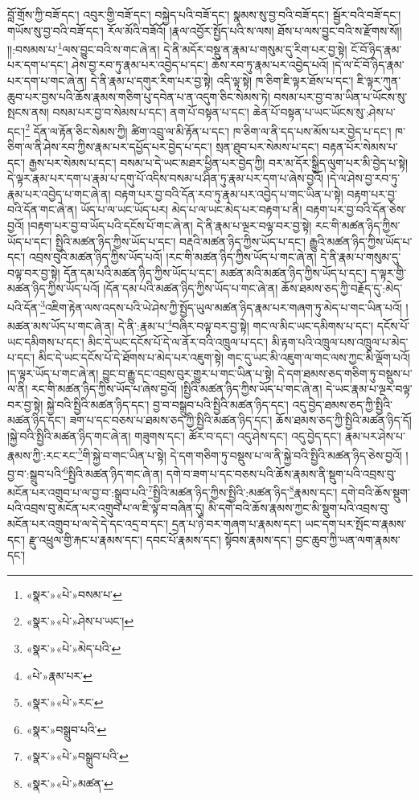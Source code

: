 བློ་གྲོས་ཀྱི་བཟོ་དང་། འབུར་གྱི་བཟོ་དང་། བསྐྱེད་པའི་བཟོ་དང་། སྣམས་སུ་བྱ་བའི་བཟོ་དང་། སྦྱོར་བའི་བཟོ་དང་། གཡོས་སུ་བྱ་བའི་བཟོ་དང་། རོལ་མོའི་བཟོའོ། །རྣལ་འབྱོར་སྤྱོད་པའི་ས་ལས། ཐོས་པ་ལས་བྱུང་བའི་ས་རྫོགས་སོ།། །།:བསམས་པ་\footnote{«སྣར་»«པེ་»བསམ་པ་}ལས་བྱུང་བའི་ས་གང་ཞེ་ན། དེ་ནི་མདོར་བསྡུ་ན་རྣམ་པ་གསུམ་དུ་རིག་པར་བྱ་སྟེ། ངོ་བོ་ཉིད་རྣམ་པར་དག་པ་དང་། ཤེས་བྱ་རབ་ཏུ་རྣམ་པར་འབྱེད་པ་དང་། ཆོས་རབ་ཏུ་རྣམ་པར་འབྱེད་པའོ། །དེ་ལ་ངོ་བོ་ཉིད་རྣམ་པར་དག་པ་གང་ཞེ་ན། དེ་ནི་རྣམ་པ་དགུར་རིག་པར་བྱ་སྟེ། འདི་ལྟ་སྟེ། ཁ་ཅིག་ཇི་ལྟར་ཐོས་པ་དང་། ཇི་ལྟར་ཀུན་ཆུབ་པར་བྱས་པའི་ཆོས་རྣམས་གཅིག་པུ་དབེན་པ་ན་འདུག་ཅིང་སེམས་ཏེ། བསམ་པར་བྱ་བ་མ་ཡིན་པ་ཡོངས་སུ་སྤངས་ནས། བསམ་པར་བྱ་བ་སེམས་པ་དང་། ནག་པོ་བསྟན་པ་དང་། ཆེན་པོ་བསྟན་པ་ཡང་ཡོངས་སུ་:ཤེས་པ་དང་།\footnote{«སྣར་»«པེ་»ཤེས་པ་ཡང་།} དོན་ལ་རྟོན་ཅིང་སེམས་ཀྱི། ཚིག་འབྲུ་ལ་མི་རྟོན་པ་དང་། ཁ་ཅིག་ལ་ནི་དད་པས་མོས་པར་བྱེད་པ་དང་། ཁ་ཅིག་ལ་ནི་ཤེས་རབ་ཀྱིས་རྣམ་པར་དཔྱོད་པར་བྱེད་པ་དང་། སྲན་ཐུབ་པར་སེམས་པ་དང་། བརྟན་པོར་སེམས་པ་དང་། རྒྱས་པར་སེམས་པ་དང་། བསམ་པ་དེ་ཡང་མཐར་ཕྱིན་པར་བྱེད་ཀྱི། བར་མ་དོར་སྒྱིད་ལུག་པར་མི་བྱེད་པ་སྟེ། དེ་ལྟར་རྣམ་པར་དག་པ་རྣམ་པ་དགུ་པོ་འདིས་བསམ་པ་ཤིན་ཏུ་རྣམ་པར་དག་པ་ཞེས་བྱའོ། །དེ་ལ་ཤེས་བྱ་རབ་ཏུ་རྣམ་པར་འབྱེད་པ་གང་ཞེ་ན། བརྟག་པར་བྱ་བའི་དོན་རབ་ཏུ་རྣམ་པར་འབྱེད་པ་གང་ཡིན་པ་སྟེ། བརྟག་པར་བྱ་བའི་དོན་གང་ཞེ་ན། ཡོད་པ་ལ་ཡང་ཡོད་པར། མེད་པ་ལ་ཡང་མེད་པར་བརྟག་པ་ནི། བརྟག་པར་བྱ་བའི་དོན་ཅེས་བྱའོ། །བརྟག་པར་བྱ་བ་ཡོད་པའི་དངོས་པོ་གང་ཞེ་ན། དེ་ནི་རྣམ་པ་ལྔར་བལྟ་བར་བྱ་སྟེ། རང་གི་མཚན་ཉིད་ཀྱིས་ཡོད་པ་དང་། སྤྱིའི་མཚན་ཉིད་ཀྱིས་ཡོད་པ་དང་། བརྡའི་མཚན་ཉིད་ཀྱིས་ཡོད་པ་དང་། རྒྱུའི་མཚན་ཉིད་ཀྱིས་ཡོད་པ་དང་། འབྲས་བུའི་མཚན་ཉིད་ཀྱིས་ཡོད་པའོ། །རང་གི་མཚན་ཉིད་ཀྱིས་ཡོད་པ་གང་ཞེ་ན། དེ་ནི་རྣམ་པ་གསུམ་དུ་བལྟ་བར་བྱ་སྟེ། དོན་དམ་པའི་མཚན་ཉིད་ཀྱིས་ཡོད་པ་དང་། མཚན་མའི་མཚན་ཉིད་ཀྱིས་ཡོད་པ་དང་། ད་ལྟར་གྱི་མཚན་ཉིད་ཀྱིས་ཡོད་པའོ། །དོན་དམ་པའི་མཚན་ཉིད་ཀྱིས་ཡོད་པ་གང་ཞེ་ན། ཆོས་ཐམས་ཅད་ཀྱི་བརྗོད་དུ་:མེད་པའི་དོན་\footnote{«སྣར་»«པེ་»མེད་པའི་}འཇིག་རྟེན་ལས་འདས་པའི་ཡེ་ཤེས་ཀྱི་སྤྱོད་ཡུལ་མཚན་ཉིད་རྣམ་པར་གཞག་ཏུ་མེད་པ་གང་ཡིན་པའོ། །མཚན་མས་ཡོད་པ་གང་ཞེ་ན། དེ་ནི་:རྣམ་པ་\footnote{«པེ་»རྣམ་པར་}བཞིར་བལྟ་བར་བྱ་སྟེ། གང་ལ་མིང་ཡང་དམིགས་པ་དང་། དངོས་པོ་ཡང་དམིགས་པ་དང་། མིང་དེ་ཡང་དངོས་པོ་དེ་ལ་ནོར་བའི་འཁྲུལ་པ་དང་། མི་རྟག་པའི་འཁྲུལ་པས་འཁྲུལ་པ་མེད་པ་དང་། མིང་དེ་ཡང་དངོས་པོ་དེ་ཐོགས་པ་མེད་པར་འཇུག་སྟེ། གང་དུ་ཡང་མི་འཇུག་ལ་གང་ལས་ཀྱང་མི་ལྡོག་པའོ། །ད་ལྟར་ཡོད་པ་གང་ཞེ་ན། བྱུང་བ་རྒྱུ་དང་འབྲས་བུར་གྱུར་པ་གང་ཡིན་པ་སྟེ། དེ་དག་ཐམས་ཅད་གཅིག་ཏུ་བསྡུས་པ་ལ་ནི། རང་གི་མཚན་ཉིད་ཀྱིས་ཡོད་པ་ཞེས་བྱའོ། །སྤྱིའི་མཚན་ཉིད་ཀྱིས་ཡོད་པ་གང་ཞེ་ན། དེ་ཡང་རྣམ་པ་ལྔར་བལྟ་བར་བྱ་སྟེ། སྐྱེ་བའི་སྤྱིའི་མཚན་ཉིད་དང་། བྱ་བ་བསྒྲུབ་པའི་སྤྱིའི་མཚན་ཉིད་དང་། འདུ་བྱེད་ཐམས་ཅད་ཀྱི་སྤྱིའི་མཚན་ཉིད་དང་། ཟག་པ་དང་བཅས་པ་ཐམས་ཅད་ཀྱི་སྤྱིའི་མཚན་ཉིད་དང་། ཆོས་ཐམས་ཅད་ཀྱི་སྤྱིའི་མཚན་ཉིད་དོ། །སྐྱེ་བའི་སྤྱིའི་མཚན་ཉིད་གང་ཞེ་ན། གཟུགས་དང་། ཚོར་བ་དང་། འདུ་ཤེས་དང་། འདུ་བྱེད་དང་། རྣམ་པར་ཤེས་པ་རྣམས་ཀྱི་:རང་རང་\footnote{«སྣར་»«པེ་»རང་}གི་སྐྱེ་བ་གང་ཡིན་པ་སྟེ། དེ་དག་གཅིག་ཏུ་བསྡུས་པ་ལ་ནི་སྐྱེ་བའི་སྤྱིའི་མཚན་ཉིད་ཅེས་བྱའོ། །བྱ་བ་:སྒྲུབ་པའི་\footnote{«སྣར་»བསྒྲུབ་པའི་}སྤྱིའི་མཚན་ཉིད་གང་ཞེ་ན། དགེ་བ་ཟག་པ་དང་བཅས་པའི་ཆོས་རྣམས་ནི་སྡུག་པའི་འབྲས་བུ་མངོན་པར་འགྲུབ་པ་ལ་བྱ་བ་:སྒྲུབ་པའི་\footnote{«སྣར་»«པེ་»བསྒྲུབ་པའི་}སྤྱིའི་མཚན་ཉིད་ཀྱིས་སྤྱིའི་:མཚན་ཉིད་\footnote{«སྣར་»«པེ་»མཚན་}རྣམས་དང་། དགེ་བའི་ཆོས་སྡུག་པའི་འབྲས་བུ་མངོན་པར་འགྲུབ་པ་ལ་ཇི་ལྟ་བ་བཞིན་དུ། མི་དགེ་བའི་ཆོས་རྣམས་ཀྱང་མི་སྡུག་པའི་འབྲས་བུ་མངོན་པར་འགྲུབ་པ་ལ་དེ་དེ་དང་འདྲ་བ་དང་། དྲན་པ་ཉེ་བར་གཞག་པ་རྣམས་དང་། ཡང་དག་པར་སྤོང་བ་རྣམས་དང་། རྫུ་འཕྲུལ་གྱི་རྐང་པ་རྣམས་དང་། དབང་པོ་རྣམས་དང་། སྟོབས་རྣམས་དང་། བྱང་ཆུབ་ཀྱི་ཡན་ལག་རྣམས་དང་། 